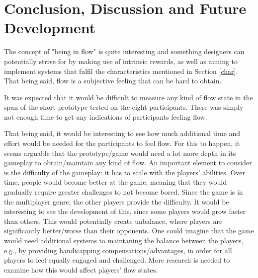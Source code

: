 \chapter{Conclusion, Discussion and Future Development}
The concept of "being in flow" is quite interesting and something designers can potentially strive for by making use of intrinsic rewards, as well as aiming to implement systems that fulfil the characteristics mentioned in Section \ref{char}. That being said, flow is a subjective feeling that can be hard to obtain.

It was expected that it would be difficult to measure any kind of flow state in the span of the short prototype tested on the eight participants. There was simply not enough time to get any indications of participants feeling flow.

That being said, it would be interesting to see how much additional time and effort would be needed for the participants to feel flow. For this to happen, it seems arguable that the prototype/game would need a lot more depth in its gameplay to obtain/maintain any kind of flow. An important element to consider is the difficulty of the gameplay: it has to scale with the players' abilities. Over time, people would become better at the game, meaning that they would gradually require greater challenges to not become bored. Since the game is in the multiplayer genre, the other players provide the difficulty. It would be interesting to see the development of this, since some players would grow faster than others. This would potentially create unbalance, where players are significantly better/worse than their opponents. One could imagine that the game would need additional systems to maintaning the balance between the players, e.g., by providing handicapping compensations/advantages, in order for all players to feel equally engaged and challenged. More research is needed to examine how this would affect players' flow states.
